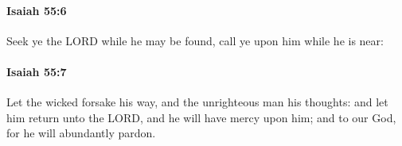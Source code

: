 		\paragraph{Isaiah 55:6} %
			\label{ISAIAH-55-6}

			Seek ye the LORD while he may be found, call ye upon him while he is near:


		\paragraph{Isaiah 55:7} %
			\label{ISAIAH-55-7}

			Let the wicked forsake his way, and the unrighteous man his thoughts: and let him return unto the LORD, and he will have mercy upon him; and to our God, for he will abundantly pardon.


